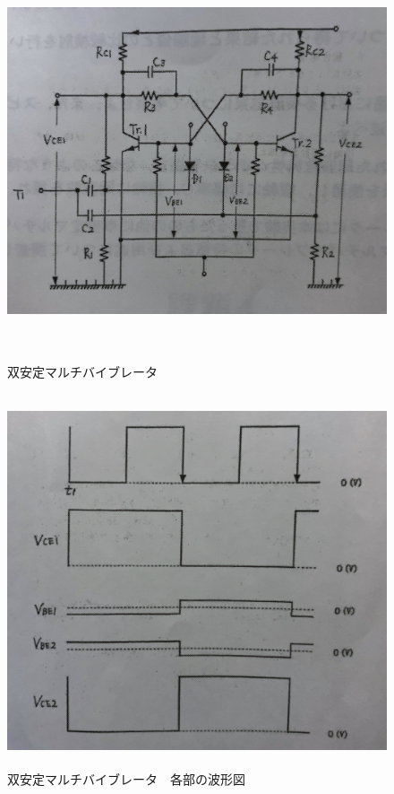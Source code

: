 \documentclass[12pt]{jarticle}
\begin{document}
\clearpage
\begin{figure}[h]
    \begin{center}
        \includegraphics[bb=0 0 2945 2373,height=11cm]{parusu_7.jpg}
    \end{center}
    \caption{双安定マルチバイブレータ}
    \label{fig7}
    \begin{center}
        \includegraphics[bb=0 0 2798 2493,height=11cm]{parusu_8.jpg}
    \end{center}
    \caption{双安定マルチバイブレータ　各部の波形図}
    \label{fig8}
\end{figure}
\clearpage
\end{document}
